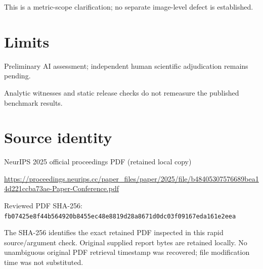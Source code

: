 \documentclass[11pt]{article}
\begin{document}
This is a metric-scope clarification; no separate image-level defect is established.

\section*{Limits}

Preliminary AI assessment; independent human scientific adjudication remains pending.\par

Analytic witnesses and static release checks do not remeasure the published benchmark results.\par

\section*{Source identity}

NeurIPS 2025 official proceedings PDF (retained local copy)

\url{https://proceedings.neurips.cc/paper_files/paper/2025/file/b48405307576689bea14d221ccba73ae-Paper-Conference.pdf}

Reviewed PDF SHA-256: \nolinkurl{fb07425e8f44b564920b8455ec48e8819d28a8671d0dc03f09167eda161e2eea}

The SHA-256 identifies the exact retained PDF inspected in this rapid source/argument check. Original supplied report bytes are retained locally. No unambiguous original PDF retrieval timestamp was recovered; file modification time was not substituted.
\end{document}
